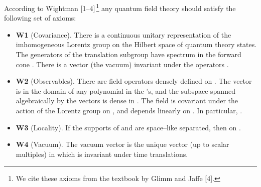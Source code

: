 \documentclass[a4paper,12pt] {article}
\begin{document}
\hspace{0.2in} According to Wightman [1--4]\,\footnote{We cite these
axioms from the textbook by Glimm and Jaffe [4].} any quantum field
theory should satisfy the following set of axioms:
\begin{itemize}
\item {\bf W1} (Covariance). There is a continuous unitary
representation of the imhomogeneous Lorentz group \coordHE{} on the
Hilbert space \coordHE{} of quantum theory states. The generators \coordHE{} of the translation subgroup have spectrum in the forward
cone \coordHE{}. There is a vector
\coordHE{} (the vacuum) invariant under the
operators \coordHE{}.

\item {\bf W2} (Observables). There are field operators
\coordHE{} densely
defined on \coordHE{}. The vector \myHighlight{$|\Psi_0\rangle$}\coordHE{} is in the domain of
any polynomial in the \coordHE{}'s, and the subspace \coordHE{}
spanned algebraically by the vectors \coordHE{} is dense in \coordHE{}. The field
\coordHE{} is covariant under the action of the Lorentz group on
\coordHE{}, and depends linearly on \coordHE{}. In particular,
\coordHE{}.

\item {\bf W3} (Locality). If the supports of \coordHE{} and
\coordHE{} are space--like separated, then
\coordHE{} on \coordHE{}.

\item {\bf W4} (Vacuum). The vacuum vector \myHighlight{$|\Psi_0\rangle$}\coordHE{} is the
unique vector (up to scalar multiples) in \coordHE{} which is
invariant under time translations.
\end{itemize}
\end{document}

